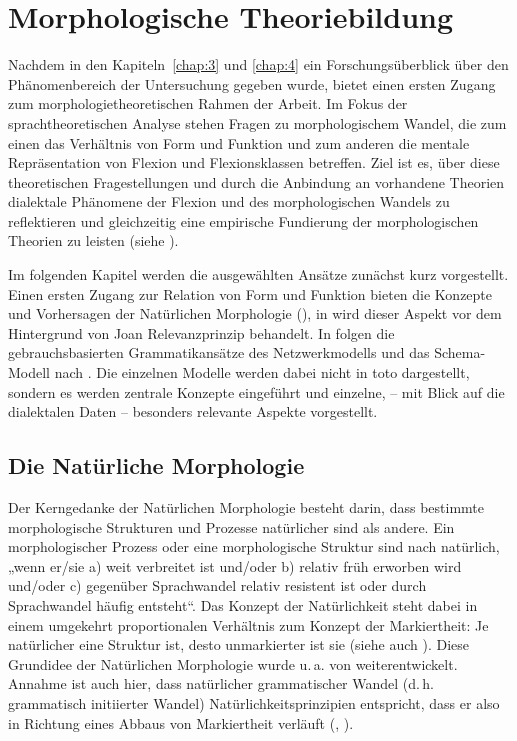\chapter{Morphologische Theoriebildung}
\label{chap:5}
Nachdem in den Kapiteln~\ref{chap:3} und \ref{chap:4} ein Forschungsüberblick über den Phänomenbereich der Untersuchung gegeben wurde, bietet  einen ersten Zugang zum morphologietheoretischen Rahmen der Arbeit. Im Fokus der sprachtheoretischen Analyse stehen Fragen zu morphologischem Wandel, die zum einen das Verhältnis von Form und Funktion und zum anderen die mentale Repräsentation von Flexion und Flexionsklassen betreffen. Ziel ist es, über diese theoretischen Fragestellungen und durch die Anbindung an vorhandene Theorien dialektale Phänomene der Flexion und des morphologischen Wandels zu reflektieren und gleichzeitig eine empirische Fundierung der morphologischen Theorien zu leisten (siehe ).

Im folgenden Kapitel werden die ausgewählten Ansätze zunächst kurz vorgestellt. Einen ersten Zugang zur Relation von Form und Funktion bieten die Konzepte und Vorhersagen der Natürlichen Morphologie (), in  wird dieser Aspekt vor dem Hintergrund von Joan  Relevanzprinzip behandelt. In  folgen die gebrauchsbasierten Grammatikansätze des Netzwerkmodells und das Schema-Modell nach \citet{Köpcke1993}. Die einzelnen Modelle werden dabei nicht in toto dargestellt, sondern es werden zentrale Konzepte eingeführt und einzelne, -- mit Blick auf die dialektalen Daten -- besonders relevante Aspekte vorgestellt.

\section{Die Natürliche Morphologie}
\label{sec:5.1}
Der Kerngedanke der Natürlichen Morphologie besteht darin, dass bestimmte morphologische Strukturen und Prozesse natürlicher sind als andere. Ein morphologischer Prozess oder eine morphologische Struktur sind nach \citet[2]{Mayerthaler1981} natürlich, „wenn er/sie a) weit verbreitet ist und/oder b) relativ früh erworben wird und/oder c) gegenüber Sprachwandel relativ resistent ist oder durch Sprachwandel häufig entsteht“. Das Konzept der Natürlichkeit steht dabei in einem umgekehrt proportionalen Verhältnis zum Konzept der Markiertheit: Je natürlicher eine Struktur ist, desto unmarkierter ist sie (siehe auch \citealt[180--182]{HarnischRowley1990}). Diese Grundidee der Natürlichen Morphologie wurde u.\,a. von \citet{Wurzel1984, Wurzel1994} weiterentwickelt. Annahme ist auch hier, dass natürlicher grammatischer Wandel (d.\,h. grammatisch initiierter Wandel) Natürlichkeitsprinzipien entspricht, dass er also in Richtung eines Abbaus von Markiertheit verläuft (\citealt[188]{Wurzel1984}, \citealt[29]{Wurzel1994}).

